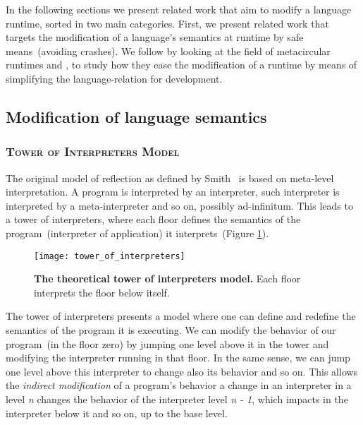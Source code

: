 In the following sections we present related work that aim to modify a language runtime, sorted in two main categories. First, we present related work that targets the modification of a language's semantics at runtime by safe means~(\ie avoiding crashes). We follow by looking at the field of metacircular runtimes and \VMs, to study how they ease the modification of a runtime by means of simplifying the language-\VM relation for development.

\subsection{Modification of language semantics}

\subsubsection*{\textsc{Tower of Interpreters Model}}

The original model of reflection as defined by Smith~\cite{Smit82c} is based on meta-level interpretation. A program is interpreted by an interpreter, such interpreter is interpreted by a meta-interpreter and so on, possibly ad-infinitum. This leads to a tower of interpreters, where each floor defines the semantics of the program~(interpreter of application) it interprets~(Figure \ref{fig:tower_of_interpreters}).

\begin{figure}[ht]
\begin{center}
\texttt{[image: tower\_of\_interpreters]}
\caption{\textbf{The theoretical tower of interpreters model.} Each floor interprets the floor below itself.\label{fig:tower_of_interpreters}
 }
\end{center}
\end{figure}

The tower of interpreters presents a model where one can define and redefine the semantics of the program it is executing. We can modify the behavior of our program~(in the floor zero) by jumping one level above it in the tower and modifying the interpreter running in that floor. In the same sense, we can jump one level above this interpreter to change also its behavior and so on. This allows the \emph{indirect modification} of a program's behavior \ie a change in an interpreter in a level \emph{n} changes the behavior of the interpreter level \emph{n - 1}, which impacts in the interpreter below it and so on, up to the base level.

